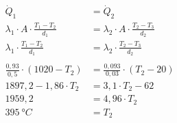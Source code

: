 \documentclass[a4paper,11pt]{article}
\begin{document}
\begin{align*}
\dot{Q}_1 &= \dot{Q}_2 \\
\lambda_1 \cdot A \cdot \frac{T_1 - T_2}{d_1} &= \lambda_2 \cdot A \cdot \frac{T_2 - T_3}{d_2} \\
\lambda_1 \cdot \frac{T_1 - T_2}{d_1} &= \lambda_2 \cdot \frac{T_2 - T_3}{d_2} \\ \\
\frac{0,93}{0,5} \cdot (1020 - T_2) &= \frac{0,093}{0,03} \cdot (T_2 - 20) \\ 
1897,2 - 1,86 \cdot T_2 &= 3,1 \cdot T_2 - 62 \\
1959,2 &= 4,96 \cdot T_2 \\
395~\text{°}C &= T_2
\end{align*}
\end{document}
